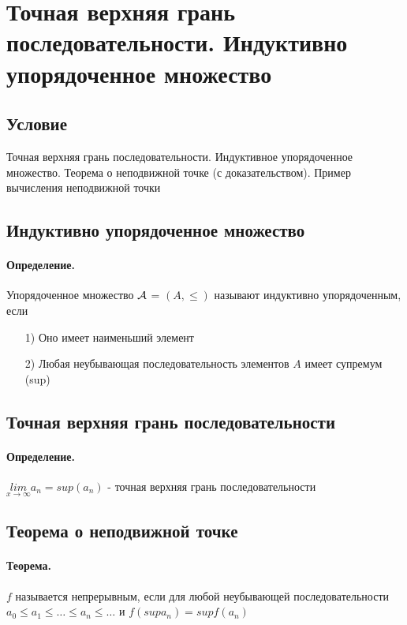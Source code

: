 \documentclass{report}
\begin{document}
\newpage

\section{Точная верхняя грань последовательности. Индуктивно упорядоченное множество}
\subsection{Условие}
Точная верхняя грань последовательности. Индуктивное упорядоченное множество.
Теорема о неподвижной точке (с доказательством). Пример вычисления неподвижной
точки

\subsection{Индуктивно упорядоченное множество}
\paragraph*{Определение.}
Упорядоченное множество ${\cal A}$ = $(A, \leq)$ называют индуктивно упорядоченным, если
\begin{itemize}
	\item[1)] Оно имеет наименьший элемент
	\item[2)] Любая неубывающая последовательность элементов $A$ имеет супремум (sup)
\end{itemize}

\subsection{Точная верхняя грань последовательности}
\paragraph*{Определение.}
$\underset{x\rightarrow \infty}{lim}a_{n} = sup(a_n)$ - точная верхняя грань последовательности

\subsection{Теорема о неподвижной точке}
\paragraph*{Теорема.}
$f$ называется непрерывным, если для любой неубывающей последовательности
$a_{0} \leq a_{1} \leq \ldots \leq a_{n} \leq \ldots$ и
$f(supa_{n}) = supf(a_{n})$
\end{document}

